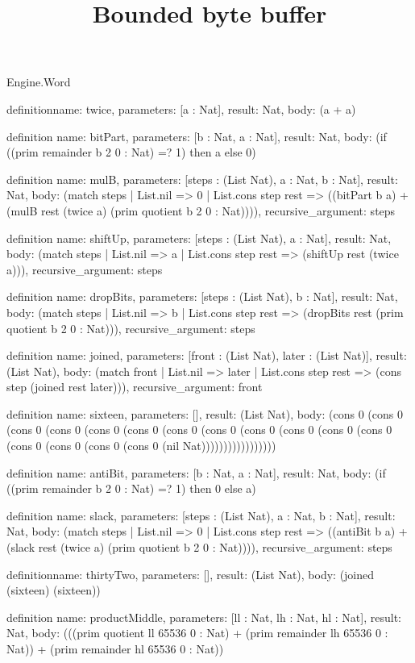 \begin{lexlean}{Engine.Word}
\title{Bounded byte buffer}
\begin{semanticmodule}
definition{name: twice, parameters: [a : Nat], result: Nat, body: (a + a)}

definition{
  name: bitPart,
  parameters: [b : Nat, a : Nat],
  result: Nat,
  body: (if ((prim remainder b 2 0 : Nat) =? 1) then a else 0)
}

definition{
  name: mulB,
  parameters: [steps : (List Nat), a : Nat, b : Nat],
  result: Nat,
  body: (match steps
    | List.nil => 0
    | List.cons step rest => ((bitPart b a) + (mulB rest (twice a) (prim quotient b 2 0 : Nat)))),
  recursive_argument: steps
}

definition{
  name: shiftUp,
  parameters: [steps : (List Nat), a : Nat],
  result: Nat,
  body: (match steps | List.nil => a | List.cons step rest => (shiftUp rest (twice a))),
  recursive_argument: steps
}

definition{
  name: dropBits,
  parameters: [steps : (List Nat), b : Nat],
  result: Nat,
  body: (match steps
    | List.nil => b
    | List.cons step rest => (dropBits rest (prim quotient b 2 0 : Nat))),
  recursive_argument: steps
}

definition{
  name: joined,
  parameters: [front : (List Nat), later : (List Nat)],
  result: (List Nat),
  body: (match front | List.nil => later | List.cons step rest => (cons step (joined rest later))),
  recursive_argument: front
}

definition{
  name: sixteen,
  parameters: [],
  result: (List Nat),
  body: (cons 0 (cons 0 (cons 0 (cons 0 (cons 0 (cons 0 (cons 0 (cons 0 (cons 0 (cons 0 (cons 0 (cons 0 (cons 0 (cons 0 (cons 0 (cons 0 (nil Nat)))))))))))))))))
}

definition{
  name: antiBit,
  parameters: [b : Nat, a : Nat],
  result: Nat,
  body: (if ((prim remainder b 2 0 : Nat) =? 1) then 0 else a)
}

definition{
  name: slack,
  parameters: [steps : (List Nat), a : Nat, b : Nat],
  result: Nat,
  body: (match steps
    | List.nil => 0
    | List.cons step rest => ((antiBit b a) + (slack rest (twice a) (prim quotient b 2 0 : Nat)))),
  recursive_argument: steps
}

definition{name: thirtyTwo, parameters: [], result: (List Nat), body: (joined (sixteen) (sixteen))}

definition{
  name: productMiddle,
  parameters: [ll : Nat, lh : Nat, hl : Nat],
  result: Nat,
  body: (((prim quotient ll 65536 0 : Nat) + (prim remainder lh 65536 0 : Nat)) + (prim remainder hl 65536 0 : Nat))
}


\end{semanticmodule}
\end{lexlean}
